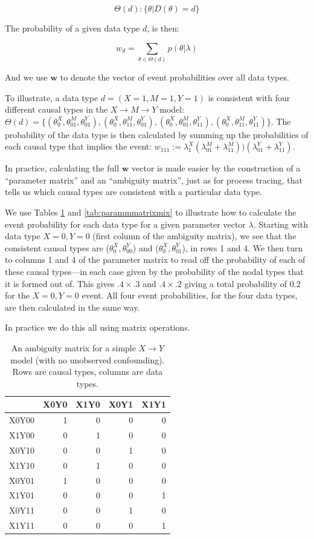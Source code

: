 \documentclass[
  12pt,
]{book}
\begin{document}
\[\Theta(d) : \{\theta| D(\theta) = d \}\]

The probability of a given data type \(d\), is then:

\[w_d = \sum_{\theta \in \Theta(d)}p(\theta|\lambda)\]

And we use \(\mathbf w\) to denote the vector of event probabilities over all data types.

To illustrate, a data type \(d = (X=1, M =1, Y=1)\) is consistent with four different causal types in the \(X\rightarrow M\rightarrow Y\) model: \(\Theta(d) = \{(\theta^X_0, \theta^M_{01}, \theta^Y_{01}), (\theta^X_0, \theta^M_{11}, \theta^Y_{01}), (\theta^X_0, \theta^M_{01}, \theta^Y_{11}), (\theta^X_0, \theta^M_{11}, \theta^Y_{11})\}\). The probability of the data type is then calculated by summing up the probabilities of each causal type that implies the event: \(w_{111}:=\lambda^X_1(\lambda^M_{01} + \lambda^M_{11}))(\lambda^Y_{01} + \lambda^Y_{11})\).

In practice, calculating the full \(\mathbf w\) vector is made easier by the construction of a ``parameter matrix'' and an ``ambiguity matrix'', just as for process tracing, that tells us which causal types are consistent with a particular data type.

We use Tables \ref{tab:ambigmatrixmix} and \ref{tab:parammmatrixmix} to illustrate how to calculate the event probability for each data type for a given parameter vector \(\lambda\). Starting with data type \(X=0, Y=0\) (first column of the ambiguity matrix), we see that the consistent causal types are (\(\theta^X_0, \theta^Y_{00}\)) and (\(\theta^X_0, \theta^Y_{01}\)), in rows 1 and 4. We then turn to columns 1 and 4 of the parameter matrix to read off the probability of each of these causal types---in each case given by the probability of the nodal types that it is formed out of. This gives \(.4 \times .3\) and \(.4\times .2\) giving a total probability of \(0.2\) for the \(X=0, Y=0\) event. All four event probabilities, for the four data types, are then calculated in the same way.

In practice we do this all using matrix operations.

\begin{table}

\caption{\label{tab:ambigmatrixmix}An ambiguity matrix for a simple $X \rightarrow Y$ model (with no unobserved confounding). Rows are causal types, columns are data types.}
\centering
\begin{tabular}[t]{l|r|r|r|r}
\hline
  & X0Y0 & X1Y0 & X0Y1 & X1Y1\\
\hline
X0Y00 & 1 & 0 & 0 & 0\\
\hline
X1Y00 & 0 & 1 & 0 & 0\\
\hline
X0Y10 & 0 & 0 & 1 & 0\\
\hline
X1Y10 & 0 & 1 & 0 & 0\\
\hline
X0Y01 & 1 & 0 & 0 & 0\\
\hline
X1Y01 & 0 & 0 & 0 & 1\\
\hline
X0Y11 & 0 & 0 & 1 & 0\\
\hline
X1Y11 & 0 & 0 & 0 & 1\\
\hline
\end{tabular}
\end{table}
\end{document}
